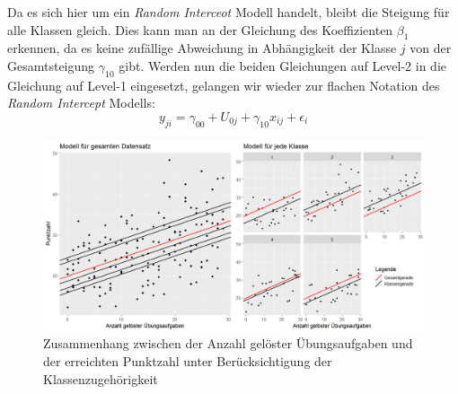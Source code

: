 \documentclass[12pt]{article}\usepackage[]{graphicx}\usepackage[]{color}
\numberwithin{equation}{section}
\begin{document}
Da es sich hier um ein \textit{Random Interceot} Modell handelt, bleibt die Steigung für alle Klassen gleich. Dies kann man an der Gleichung des Koeffizienten $\beta_{1}$ erkennen, da es keine zufällige Abweichung in Abhängigkeit der Klasse $j$ von der Gesamtsteigung $\gamma_{10}$ gibt. Werden nun die beiden Gleichungen auf Level-2 in die Gleichung auf Level-1 eingesetzt, gelangen wir wieder zur flachen Notation des \textit{Random Intercept} Modells:
\begin{equation}
y_{ji} = \gamma_{00} + U_{0j} + \gamma_{10}x_{ij} + \epsilon_{i}
\end{equation}

\begin{figure}[t!]
\centering
\includegraphics[width = \textwidth]{random_intercept}
\caption{Zusammenhang zwischen der Anzahl gelöster Übungsaufgaben und der erreichten Punktzahl unter Berücksichtigung der Klassenzugehörigkeit}
\label{fig:random_intercept}
\end{figure}
\end{document}
